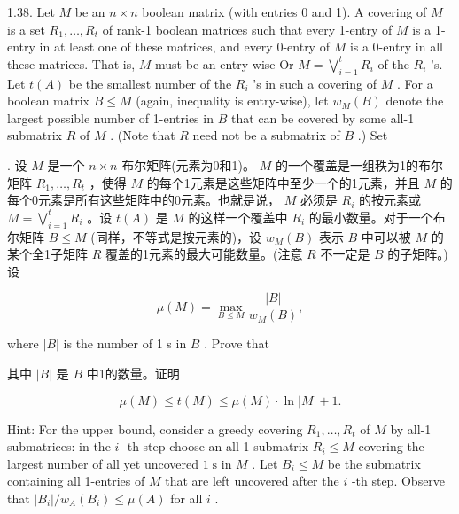 \documentclass[10pt]{article}
\begin{document}
1.38. Let \(M\) be an \(n \times  n\) boolean matrix (with entries 0 and 1). A covering of \(M\) is a set \({R}_{1},\ldots ,{R}_{t}\) of rank-1 boolean matrices such that every 1-entry of \(M\) is a 1-entry in at least one of these matrices, and every 0-entry of \(M\) is a 0-entry in all these matrices. That is, \(M\) must be an entry-wise Or \(M = \mathop{\bigvee }\limits_{{i = 1}}^{t}{R}_{i}\) of the \({R}_{i}\) ’s. Let \(t\left( A\right)\) be the smallest number of the \({R}_{i}\) ’s in such a covering of \(M\) . For a boolean matrix \(B \leq  M\) (again, inequality is entry-wise), let \({w}_{M}\left( B\right)\) denote the largest possible number of 1-entries in \(B\) that can be covered by some all-1 submatrix \(R\) of \(M\) . (Note that \(R\) need not be a submatrix of \(B\) .) Set

\begin{tcolorbox}. 设 \(M\) 是一个 \(n \times  n\) 布尔矩阵(元素为0和1)。 \(M\) 的一个覆盖是一组秩为1的布尔矩阵 \({R}_{1},\ldots ,{R}_{t}\) ，使得 \(M\) 的每个1元素是这些矩阵中至少一个的1元素，并且 \(M\) 的每个0元素是所有这些矩阵中的0元素。也就是说， \(M\) 必须是 \({R}_{i}\) 的按元素或 \(M = \mathop{\bigvee }\limits_{{i = 1}}^{t}{R}_{i}\) 。设 \(t\left( A\right)\) 是 \(M\) 的这样一个覆盖中 \({R}_{i}\) 的最小数量。对于一个布尔矩阵 \(B \leq  M\) (同样，不等式是按元素的)，设 \({w}_{M}\left( B\right)\) 表示 \(B\) 中可以被 \(M\) 的某个全1子矩阵 \(R\) 覆盖的1元素的最大可能数量。(注意 \(R\) 不一定是 \(B\) 的子矩阵。)设
\end{tcolorbox}

\[
\mu \left( M\right)  = \mathop{\max }\limits_{{B \leq  M}}\frac{\left| B\right| }{{w}_{M}\left( B\right) },
\]

where \(\left| B\right|\) is the number of 1 s in \(B\) . Prove that

\begin{tcolorbox}\relax
其中 \(\left| B\right|\) 是 \(B\) 中1的数量。证明
\end{tcolorbox}

\[
\mu \left( M\right)  \leq  t\left( M\right)  \leq  \mu \left( M\right)  \cdot  \ln \left| M\right|  + 1.
\]

Hint: For the upper bound, consider a greedy covering \({R}_{1},\ldots ,{R}_{t}\) of \(M\) by all-1 submatrices: in the \(i\) -th step choose an all-1 submatrix \({R}_{i} \leq  M\) covering the largest number of all yet uncovered \(1\mathrm{\;s}\) in \(M\) . Let \({B}_{i} \leq  M\) be the submatrix containing all 1-entries of \(M\) that are left uncovered after the \(i\) -th step. Observe that \(\left| {B}_{i}\right| /{w}_{A}\left( {B}_{i}\right)  \leq  \mu \left( A\right)\) for all \(i\) .
\end{document}
